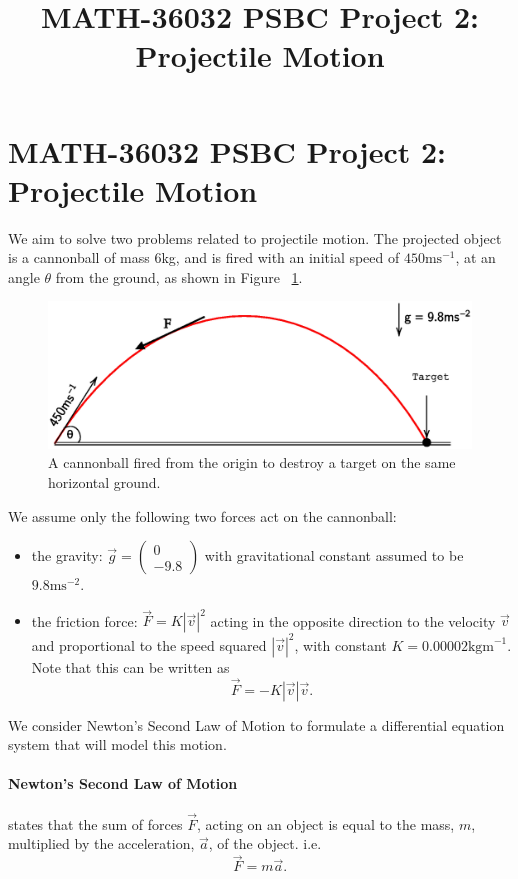\documentclass[11pt]{report}
\title{MATH-36032 PSBC Project 2: Projectile Motion}
\begin{document}
\section*{MATH-36032 PSBC Project 2: Projectile Motion}
We aim to solve two problems related to projectile motion. The projected object is a cannonball of mass $6$kg, and is fired with an initial speed of $450\text{ms}^{-1}$, at an angle $\theta$ from the ground, as shown in Figure ~\ref{fig:projectile1}.

\begin{figure}[h]
	\centering
  	\includegraphics[scale=0.5]{assets/projectile1.eps}
  	\caption{A cannonball fired from the origin to destroy a target on the same horizontal ground.}
  	\label{fig:projectile1}
\end{figure}

We assume only the following two forces act on the cannonball:
\begin{itemize}
	\item the gravity: $\vec{g} = \begin{pmatrix} 0 \\ -9.8 \end{pmatrix}$ with gravitational constant assumed to be $9.8\text{ms}^{-2}$.
	\item the friction force: $\vec{F}=K|\vec{v}|^2$ acting in the opposite direction to the velocity $\vec{v}$ and proportional to the speed squared $|\vec{v}|^2$, with constant $K=0.00002\text{kgm}^{-1}$. Note that this can be written as $$\vec{F}=-K|\vec{v}|\vec{v}.$$
\end{itemize}

We consider Newton's Second Law of Motion to formulate a differential equation system that will model this motion.
\paragraph{Newton's Second Law of Motion} states that the sum of forces $\vec{F}$, acting on an object is equal to the mass, $m$, multiplied by the acceleration, $\vec{a}$, of the object. i.e. $$\vec{F}=m\vec{a}.$$
\end{document}
